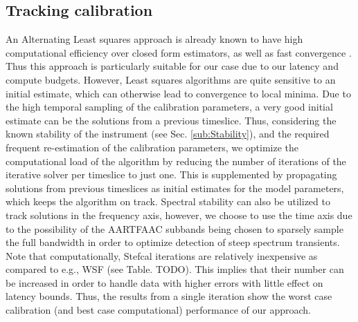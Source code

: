 \documentclass{aa}
\begin{document}
\subsection{Tracking calibration}

An  Alternating   Least  squares  approach   is  already  known  to   have  high
computational  efficiency   over  closed  form  estimators,  as   well  as  fast
convergence  \citep{boonstra2003gain}.   Thus   this  approach  is  particularly
suitable for  our case due to  our latency and compute  budgets.  However, Least
squares  algorithms  are quite  sensitive  to  an  initial estimate,  which  can
otherwise lead to convergence to local minima. Due to the high temporal sampling
of the calibration parameters, a very good initial estimate can be the solutions
from  a  previous timeslice.   Thus,  considering  the  known stability  of  the
instrument   (see  Sec.    \ref{sub:Stability}),  and   the   required  frequent
re-estimation of the calibration  parameters, we optimize the computational load
of the  algorithm by reducing the  number of iterations of  the iterative solver
per timeslice  to just one. This  is supplemented by  propagating solutions from
previous timeslices as  initial estimates for the model  parameters, which keeps
the  algorithm  on track.  Spectral  stability can  also  be  utilized to  track
solutions in the frequency axis, however, we  choose to use the time axis due to
the possibility  of the  AARTFAAC subbands being  chosen to sparsely  sample the
full  bandwidth in  order to  optimize detection  of steep  spectrum transients.
Note  that computationally,  Stefcal  iterations are  relatively inexpensive  as
compared to e.g.,  WSF (see Table. TODO). This implies that  their number can be
increased  in order  to handle  data with  higher errors  with little  effect on
latency bounds.  Thus, the results from  a single iteration show  the worst case
calibration (and best case computational) performance of our approach.
\end{document}
